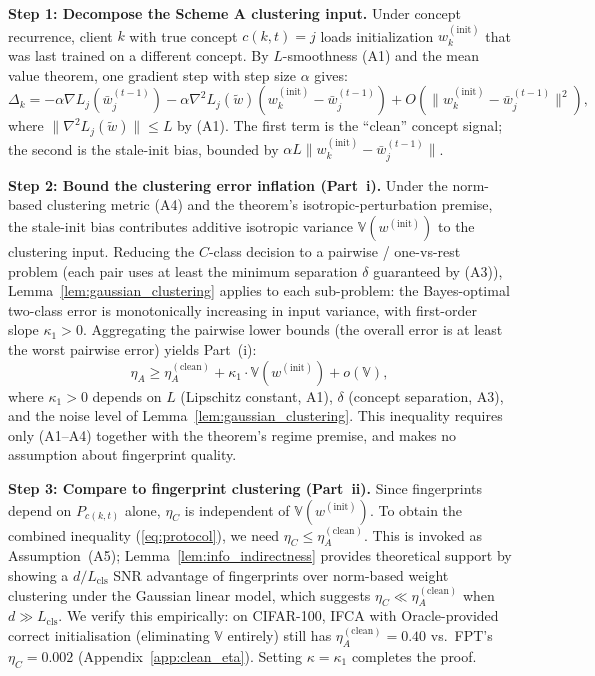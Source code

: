 \documentclass[11pt]{article}
\newcommand{\V}{\mathbb{V}}
\newcommand{\wbar}{\bar{w}}
\begin{document}
\textbf{Step 1: Decompose the Scheme A clustering input.}
Under concept recurrence, client $k$ with true concept $c(k,t) = j$ loads initialization $w_k^{(\mathrm{init})}$ that was last trained on a different concept.
By $L$-smoothness (A1) and the mean value theorem, one gradient step with step size $\alpha$ gives:
\begin{equation}
\Delta_k = -\alpha \nabla L_j(\wbar_j^{(t-1)}) - \alpha \nabla^2 L_j(\tilde w)(w_k^{(\mathrm{init})} - \wbar_j^{(t-1)}) + O(\|w_k^{(\mathrm{init})} - \wbar_j^{(t-1)}\|^2),
\end{equation}
where $\|\nabla^2 L_j(\tilde w)\| \le L$ by (A1).
The first term is the ``clean'' concept signal; the second is the stale-init bias, bounded by $\alpha L \|w_k^{(\mathrm{init})} - \wbar_j^{(t-1)}\|$.

\textbf{Step 2: Bound the clustering error inflation (Part~i).}
Under the norm-based clustering metric (A4) and the theorem's isotropic-perturbation premise, the stale-init bias contributes additive isotropic variance $\V(w^{(\mathrm{init})})$ to the clustering input.
Reducing the $C$-class decision to a pairwise / one-vs-rest problem (each pair uses at least the minimum separation $\delta$ guaranteed by (A3)), Lemma~\ref{lem:gaussian_clustering} applies to each sub-problem: the Bayes-optimal two-class error is monotonically increasing in input variance, with first-order slope $\kappa_1 > 0$.
Aggregating the pairwise lower bounds (the overall error is at least the worst pairwise error) yields Part~(i):
\begin{equation}
\eta_A \ge \eta_A^{(\mathrm{clean})} + \kappa_1 \cdot \V(w^{(\mathrm{init})}) + o(\V),
\end{equation}
where $\kappa_1 > 0$ depends on $L$ (Lipschitz constant, A1), $\delta$ (concept separation, A3), and the noise level of Lemma~\ref{lem:gaussian_clustering}.
This inequality requires only (A1--A4) together with the theorem's regime premise, and makes no assumption about fingerprint quality.

\textbf{Step 3: Compare to fingerprint clustering (Part~ii).}
Since fingerprints depend on $P_{c(k,t)}$ alone, $\eta_C$ is independent of $\V(w^{(\mathrm{init})})$.
To obtain the combined inequality (\ref{eq:protocol}), we need $\eta_C \le \eta_A^{(\mathrm{clean})}$.
This is invoked as Assumption~(A5); Lemma~\ref{lem:info_indirectness} provides theoretical support by showing a $d/L_{\mathrm{cls}}$ SNR advantage of fingerprints over norm-based weight clustering under the Gaussian linear model, which suggests $\eta_C \ll \eta_A^{(\mathrm{clean})}$ when $d \gg L_{\mathrm{cls}}$.
We verify this empirically: on CIFAR-100, IFCA with Oracle-provided correct initialisation (eliminating $\V$ entirely) still has $\eta_A^{(\mathrm{clean})} = 0.40$ vs.\ FPT's $\eta_C = 0.002$ (Appendix~\ref{app:clean_eta}).
Setting $\kappa = \kappa_1$ completes the proof.
\end{document}

